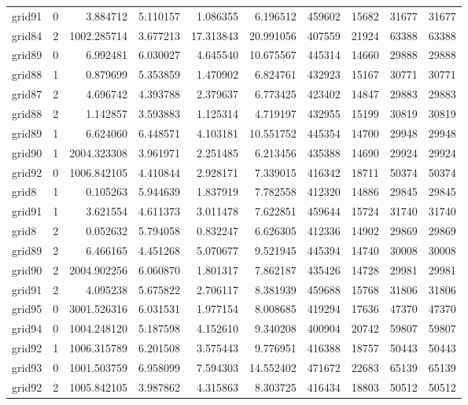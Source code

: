 \begin{longtable}{|l|r|r|r|r|r|r|r|r|r|}
grid91 & 0 & 3.884712 & 5.110157 & 1.086355 & 6.196512 & 459602 & 15682 & 31677 & 31677 \\
grid84 & 2 & 1002.285714 & 3.677213 & 17.313843 & 20.991056 & 407559 & 21924 & 63388 & 63388 \\
grid89 & 0 & 6.992481 & 6.030027 & 4.645540 & 10.675567 & 445314 & 14660 & 29888 & 29888 \\
grid88 & 1 & 0.879699 & 5.353859 & 1.470902 & 6.824761 & 432923 & 15167 & 30771 & 30771 \\
grid87 & 2 & 4.696742 & 4.393788 & 2.379637 & 6.773425 & 423402 & 14847 & 29883 & 29883 \\
grid88 & 2 & 1.142857 & 3.593883 & 1.125314 & 4.719197 & 432955 & 15199 & 30819 & 30819 \\
grid89 & 1 & 6.624060 & 6.448571 & 4.103181 & 10.551752 & 445354 & 14700 & 29948 & 29948 \\
grid90 & 1 & 2004.323308 & 3.961971 & 2.251485 & 6.213456 & 435388 & 14690 & 29924 & 29924 \\
grid92 & 0 & 1006.842105 & 4.410844 & 2.928171 & 7.339015 & 416342 & 18711 & 50374 & 50374 \\
grid8 & 1 & 0.105263 & 5.944639 & 1.837919 & 7.782558 & 412320 & 14886 & 29845 & 29845 \\
grid91 & 1 & 3.621554 & 4.611373 & 3.011478 & 7.622851 & 459644 & 15724 & 31740 & 31740 \\
grid8 & 2 & 0.052632 & 5.794058 & 0.832247 & 6.626305 & 412336 & 14902 & 29869 & 29869 \\
grid89 & 2 & 6.466165 & 4.451268 & 5.070677 & 9.521945 & 445394 & 14740 & 30008 & 30008 \\
grid90 & 2 & 2004.902256 & 6.060870 & 1.801317 & 7.862187 & 435426 & 14728 & 29981 & 29981 \\
grid91 & 2 & 4.095238 & 5.675822 & 2.706117 & 8.381939 & 459688 & 15768 & 31806 & 31806 \\
grid95 & 0 & 3001.526316 & 6.031531 & 1.977154 & 8.008685 & 419294 & 17636 & 47370 & 47370 \\
grid94 & 0 & 1004.248120 & 5.187598 & 4.152610 & 9.340208 & 400904 & 20742 & 59807 & 59807 \\
grid92 & 1 & 1006.315789 & 6.201508 & 3.575443 & 9.776951 & 416388 & 18757 & 50443 & 50443 \\
grid93 & 0 & 1001.503759 & 6.958099 & 7.594303 & 14.552402 & 471672 & 22683 & 65139 & 65139 \\
grid92 & 2 & 1005.842105 & 3.987862 & 4.315863 & 8.303725 & 416434 & 18803 & 50512 & 50512 \\

\end{longtable}
